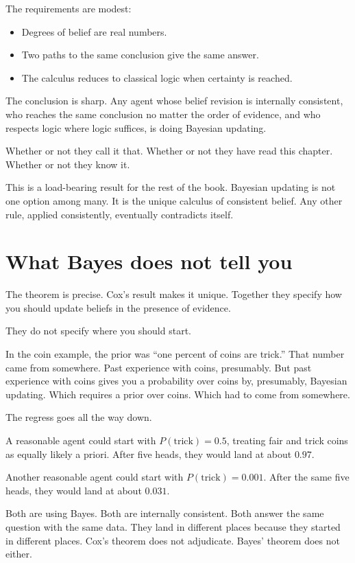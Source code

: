The requirements are modest:

\begin{itemize}
\item Degrees of belief are real numbers.
\item Two paths to the same conclusion give the same answer.
\item The calculus reduces to classical logic when certainty is reached.
\end{itemize}

The conclusion is sharp. Any agent whose belief revision is internally consistent, who reaches the same conclusion no matter the order of evidence, and who respects logic where logic suffices, is doing Bayesian updating.

Whether or not they call it that. Whether or not they have read this chapter. Whether or not they know it.

This is a load-bearing result for the rest of the book. Bayesian updating is not one option among many. It is the unique calculus of consistent belief. Any other rule, applied consistently, eventually contradicts itself.

\section*{What Bayes does not tell you}

The theorem is precise. Cox's result makes it unique. Together they specify how you should update beliefs in the presence of evidence.

They do not specify where you should start.

In the coin example, the prior was ``one percent of coins are trick.'' That number came from somewhere. Past experience with coins, presumably. But past experience with coins gives you a probability over coins by, presumably, Bayesian updating. Which requires a prior over coins. Which had to come from somewhere.

The regress goes all the way down.

A reasonable agent could start with $P(\text{trick}) = 0.5$, treating fair and trick coins as equally likely a priori. After five heads, they would land at about $0.97$.

Another reasonable agent could start with $P(\text{trick}) = 0.001$. After the same five heads, they would land at about $0.031$.

Both are using Bayes. Both are internally consistent. Both answer the same question with the same data. They land in different places because they started in different places. Cox's theorem does not adjudicate. Bayes' theorem does not either.

